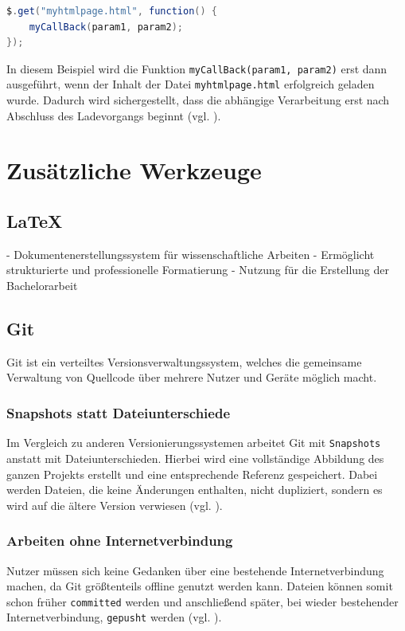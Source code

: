 \documentclass[oneside]{ausarbeitung}
\begin{document}
\begin{lstlisting}[language=Java, caption={Verwendung eines Callbacks in jQuery}]
$.get("myhtmlpage.html", function() { 
    myCallBack(param1, param2); 
});
\end{lstlisting}

In diesem Beispiel wird die Funktion \texttt{myCallBack(param1, param2)} erst dann ausgeführt, wenn der Inhalt der Datei \texttt{myhtmlpage.html} erfolgreich geladen wurde. Dadurch wird sichergestellt, dass die abhängige Verarbeitung erst nach Abschluss des Ladevorgangs beginnt (vgl. \parencite{jquery_api}).  


\section{Zusätzliche Werkzeuge}

\subsection{LaTeX}
- Dokumentenerstellungssystem für wissenschaftliche Arbeiten  
- Ermöglicht strukturierte und professionelle Formatierung  
- Nutzung für die Erstellung der Bachelorarbeit  

\subsection{Git}

Git ist ein verteiltes Versionsverwaltungssystem, welches die gemeinsame Verwaltung von Quellcode über mehrere Nutzer und Geräte möglich macht.  

\subsubsection{Snapshots statt Dateiunterschiede}
Im Vergleich zu anderen Versionierungssystemen arbeitet Git mit \texttt{Snapshots} anstatt mit Dateiunterschieden. Hierbei wird eine vollständige Abbildung des ganzen Projekts erstellt und eine entsprechende Referenz gespeichert. Dabei werden Dateien, die keine Änderungen enthalten, nicht dupliziert, sondern es wird auf die ältere Version verwiesen (vgl. \parencite{git_intro}).  

\subsubsection{Arbeiten ohne Internetverbindung}
Nutzer müssen sich keine Gedanken über eine bestehende Internetverbindung machen, da Git größtenteils offline genutzt werden kann. Dateien können somit schon früher \texttt{committed} werden und anschließend später, bei wieder bestehender Internetverbindung, \texttt{gepusht} werden (vgl. \parencite{git_intro}).  
\end{document}

